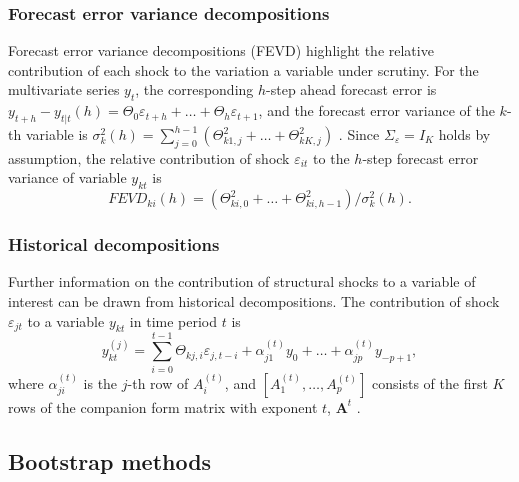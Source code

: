 \documentclass[nojss]{jss}\usepackage[]{graphicx}\usepackage[]{color}
\begin{document}
\subsubsection*{Forecast error variance decompositions}
Forecast error variance decompositions (FEVD) highlight the relative contribution of each shock to the variation a variable under scrutiny. For the multivariate series $y_t$, the corresponding $h$-step ahead forecast error is  $y_{t+h}-y_{t|t}(h)=\Theta_0\varepsilon_{t+h}+\ldots+\Theta_h\varepsilon_{t+1}$, and the forecast error variance of the $k$-th variable is $\sigma_k^2(h)=\sum_{j=0}^{h-1}(\Theta^2_{k1,j}+\ldots+\Theta^2_{kK,j})$ \citep{IntroductionMultipleTS}. Since $\Sigma_{\varepsilon}=I_K$ holds by assumption, the relative contribution of shock $\varepsilon_{it}$ to the $h$-step forecast error variance of variable $y_{kt}$ is
\begin{equation*}
FEVD_{ki}(h)=(\Theta^2_{ki,0}+\ldots+\Theta^2_{ki,h-1})/\sigma_k^2(h).
\end{equation*}

\subsubsection*{Historical decompositions}
Further information on the contribution of structural shocks to a variable of interest can be drawn from historical decompositions. The contribution of shock $\varepsilon_{jt}$ to a variable $y_{kt}$ in time period $t$ is
\begin{equation*}
y_{kt}^{(j)}=\sum_{i=0}^{t-1}\Theta_{kj,i}\varepsilon_{j,t-i}+\alpha_{j1}^{(t)}y_0+\ldots+\alpha_{jp}^{(t)}y_{-p+1},
\end{equation*}
where $\alpha_{ji}^{(t)}$ is the $j$-th row of $A_i^{(t)}$, and $[A_1^{(t)},\ldots,A_p^{(t)}]$ consists of the first $K$ rows of the companion form matrix with exponent $t$, $\mathbf{ A}^t$ \citep[see][for more details]{IntroductionMultipleTS}.

\subsection{Bootstrap methods}\label{sec:bootstrap}
\end{document}
